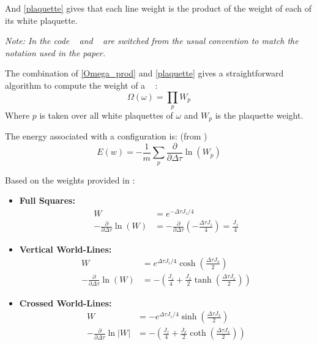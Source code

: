 \documentclass[a4paper]{article}
\newcommand{\code}[1]{%
    \mbox{\ttfamily%
        \detokenize{#1}%
    }%
}
\newcommand{\Worldline}[0]{\code{Worldline}}
\begin{document}
And \cref{plaquette} gives that each line weight is the product of the weight of each of its white plaquette.

\textit{Note: In the code} \code{i} \textit{and} \code{j} \textit{are switched from the usual convention to match the notation used in the paper.}

The combination of \cref{Omega_prod} and \cref{plaquette} gives a straightforward algorithm to compute the weight of a \Worldline:
\begin{equation}
     \Omega(\omega) = \prod_{p} W_p
\end{equation}
Where $p$ is taken over all white plaquettes of $\omega$ and $W_p$ is the plaquette weight.

The energy associated with a configuration is: (from \cite{Assaad2008})
\begin{equation}
    E(w) = -\frac{1}{m} \sum_{p} \frac{\partial}{\partial \Delta\tau} \ln(W_p)
\end{equation}

Based on the weights provided in \cite{Assaad2008} :

\begin{itemize}
    \item \textbf{Full Squares:}
    \begin{align}
        W &= e^{-\Delta\tau J_z / 4} \\
        -\frac{\partial}{\partial \Delta\tau} \ln(W) &= -\frac{\partial}{\partial \Delta\tau} \left( -\frac{\Delta\tau J_z}{4} \right) = \frac{J_z}{4}
    \end{align}

    \item \textbf{Vertical World-Lines:}
    \begin{align}
        W &= e^{\Delta\tau J_z / 4} \cosh\left(\frac{\Delta\tau J_x}{2}\right) \\
        -\frac{\partial}{\partial \Delta\tau} \ln(W) &= -\left( \frac{J_z}{4} + \frac{J_x}{2} \tanh\left(\frac{\Delta\tau J_x}{2}\right) \right)
    \end{align}

    \item \textbf{Crossed World-Lines:}
    \begin{align}
        W &= -e^{\Delta\tau J_z / 4} \sinh\left(\frac{\Delta\tau J_x}{2}\right) \\
        -\frac{\partial}{\partial \Delta\tau} \ln|W| &= -\left( \frac{J_z}{4} + \frac{J_x}{2} \coth\left(\frac{\Delta\tau J_x}{2}\right) \right)
    \end{align}
\end{itemize}
\end{document}
